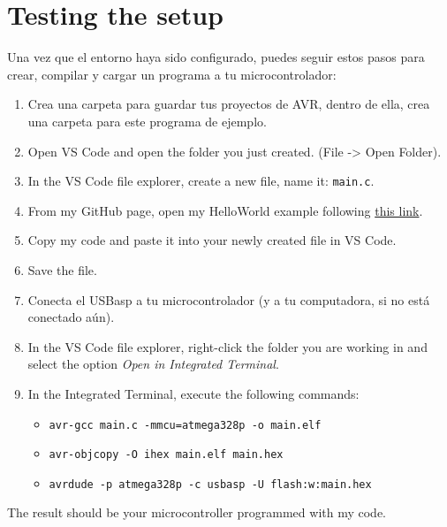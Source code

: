 \documentclass[10pt,letterpaper]{article}
\begin{document}
\section{Testing the setup}
Una vez que el entorno haya sido configurado, puedes seguir estos pasos para crear, compilar y cargar un programa a tu microcontrolador:
\begin{enumerate}
    \item Crea una carpeta para guardar tus proyectos de AVR, dentro de ella, crea una carpeta para este programa de ejemplo.
    \item Open VS Code and open the folder you just created. (File -> Open Folder).
    \item In the VS Code file explorer, create a new file, name it: {\color{ForestGreen}\texttt{main.c}}.
    \item From my GitHub page, open my HelloWorld example following \href{https://github.com/dagmtz/I7266/blob/master/001_Assets/004_Examples/mega328P/001_HelloWorld/main.c}{this link}.
    \item Copy my code and paste it into your newly created file in VS Code.
    \item Save the file.
    \item Conecta el USBasp a tu microcontrolador (y a tu computadora, si no está conectado aún).
    \item In the VS Code file explorer, right-click the folder you are working in and select the option \textit{Open in Integrated Terminal}.
    \item In the Integrated Terminal, execute the following commands: 
    \begin{itemize}
        \item \texttt{avr-gcc main.c -mmcu=atmega328p -o main.elf}
        \item \texttt{avr-objcopy -O ihex main.elf main.hex}
        \item \texttt{avrdude -p atmega328p -c usbasp -U flash:w:main.hex}
    \end{itemize}
\end{enumerate}
The result should be your microcontroller programmed with my code.
\end{document}

